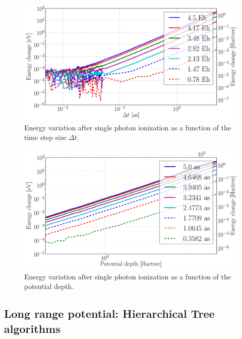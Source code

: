 
\begin{figure}
 \centering
 \includegraphics[width=\figurewidth]{figures/numerical_heating_dt}
 \caption{\label{fig:potential:heating:dt}Energy variation after single photon
          ionization as a function of the time step size $\Delta t$.}
\end{figure}

\begin{figure}
 \centering
 \includegraphics[width=\figurewidth]{figures/numerical_heating_D}
 \caption{\label{fig:potential:heating:depth}Energy variation after single photon
          ionization as a function of the potential depth.}
\end{figure}





\subsection{Long range potential: Hierarchical Tree algorithms}

